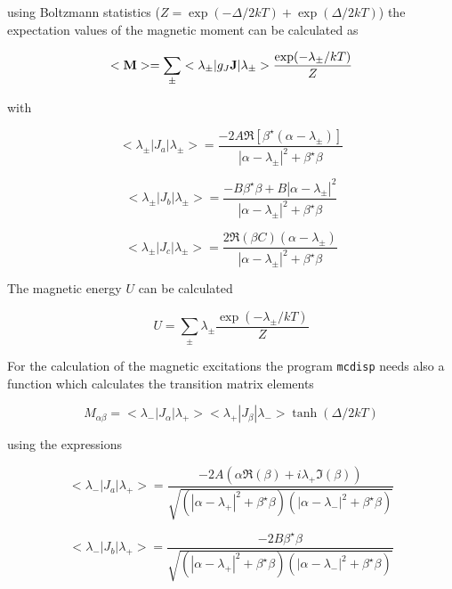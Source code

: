 using Boltzmann statistics ($Z=\exp(-\Delta/2kT)+\exp(\Delta/2kT)$) the expectation values of the magnetic
moment can be calculated as

\begin{equation}
<{\mathbf M}>=\sum_{\pm}<\lambda_{\pm}|g_J{\mathbf J}|\lambda_{\pm}>
\frac{\exp(-\lambda_{\pm}/kT)}{Z}
\end{equation}

with 

\begin{equation}
<\lambda_{\pm}|J_a|\lambda_{\pm}>=
\frac{-2A \Re[\beta^{\star}(\alpha-\lambda_{\pm})]}
{|\alpha-\lambda_{\pm}|^2+\beta^{\star}\beta}
\end{equation}

\begin{equation}
<\lambda_{\pm}|J_b|\lambda_{\pm}>=
\frac{-B \beta^{\star}\beta+B|\alpha-\lambda_{\pm}|^2}
{|\alpha-\lambda_{\pm}|^2+\beta^{\star}\beta}
\end{equation}

\begin{equation}
<\lambda_{\pm}|J_c|\lambda_{\pm}>=
\frac{2 \Re(\beta C)(\alpha-\lambda_{\pm})}
{|\alpha-\lambda_{\pm}|^2+\beta^{\star}\beta}
\end{equation}

The magnetic energy $U$ can be calculated

\begin{equation}
U=\sum_{\pm}\lambda_{\pm}\frac{\exp(-\lambda_{\pm}/kT)}{Z}
\end{equation}

For the calculation of the magnetic excitations the program {\tt mcdisp}
needs also a function which calculates the transition matrix elements

\begin{equation}
M_{\alpha\beta}=<\lambda_-|J_{\alpha}|\lambda_+>
<\lambda_+|J_{\beta}|\lambda_-> \tanh(\Delta/2kT)
\end{equation}

using the expressions

\begin{equation}
<\lambda_-|J_a|\lambda_+>=
\frac{-2A (\alpha\Re(\beta)+i\lambda_+ \Im(\beta))}
{\sqrt{(|\alpha-\lambda_{+}|^2+\beta^{\star}\beta)
(|\alpha-\lambda_{-}|^2+\beta^{\star}\beta)}}
\end{equation}

\begin{equation}
<\lambda_-|J_b|\lambda_+>=
\frac{-2B \beta^{\star} \beta}
{\sqrt{(|\alpha-\lambda_{+}|^2+\beta^{\star}\beta)
(|\alpha-\lambda_{-}|^2+\beta^{\star}\beta)}}
\end{equation}

